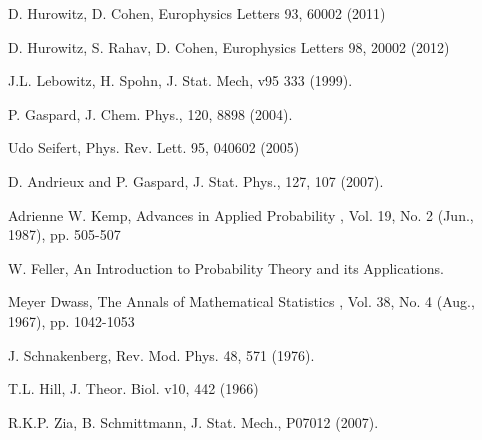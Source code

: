 \documentclass[aps,pre,floats,floatfix,twocolumn]{revtex4}
\newcommand{\Fig}[1]{\textcolor{blue}{Fig.}\!\!~\ref{#1}}
\begin{document}
\begin{thebibliography}{99}

D. Hurowitz, D. Cohen,
Europhysics Letters 93, 60002 (2011) 


D. Hurowitz, S. Rahav, D. Cohen,
Europhysics Letters 98, 20002 (2012) 



J.L. Lebowitz, H. Spohn, J. Stat. Mech, v95 333 (1999).

P. Gaspard, J. Chem. Phys., 120, 8898 (2004).

Udo Seifert, 
Phys. Rev. Lett. 95, 040602 (2005)

D. Andrieux and P. Gaspard, J. Stat. Phys., 127, 107 (2007).



Adrienne W. Kemp,
Advances in Applied Probability , Vol. 19, No. 2 (Jun., 1987), pp. 505-507

W. Feller, 
An Introduction to Probability Theory and its Applications.

Meyer Dwass,
The Annals of Mathematical Statistics , Vol. 38, No. 4 (Aug., 1967), pp. 1042-1053



J. Schnakenberg,
Rev. Mod. Phys. 48, 571 (1976).

T.L. Hill, 
J. Theor. Biol. v10, 442 (1966)

R.K.P. Zia, B. Schmittmann, 
J. Stat. Mech., P07012 (2007).






\end{thebibliography}
\end{document}
